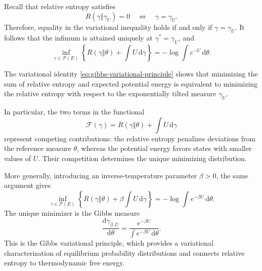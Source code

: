 \documentclass[12pt,a4paper,oneside]{book}
\begin{document}
\begin{solution}
Recall that relative entropy satisfies
\begin{equation*}
    R(\gamma\Vert\gamma_U)=0
    \quad\Longleftrightarrow\quad
    \gamma=\gamma_U.
\end{equation*}
Therefore, equality in the variational inequality holds if and
only if $\gamma=\gamma_U$. It follows that the infimum is attained
uniquely at $\gamma^*=\gamma_U$, and
\begin{equation}
    \boxed{
    \inf_{\gamma\in\mathcal P(E)}
    \left\{
        R(\gamma\Vert\theta)
        +\int U\,\mathrm d\gamma
    \right\}
    =
    -\log\int e^{-U}\,\mathrm d\theta.
    }
    \label{eq:gibbs-variational-principle}
\end{equation}

\end{solution}

\begin{Notice}
The variational identity \eqref{eq:gibbs-variational-principle} shows that minimizing the sum of relative
entropy and expected potential energy is equivalent to minimizing
the relative entropy with respect to the exponentially tilted
measure $\gamma_U$.

In particular, the two terms in the functional
\begin{equation*}
    \mathcal F(\gamma)
    =
    R(\gamma\Vert\theta)+\int U\,\mathrm d\gamma
\end{equation*}
represent competing contributions: the relative entropy penalizes
deviations from the reference measure $\theta$, whereas the
potential energy favors states with smaller values of $U$.
Their competition determines the unique minimizing distribution.

More generally, introducing an inverse-temperature parameter
$\beta>0$, the same argument gives
\begin{equation*}
    \inf_{\gamma\in\mathcal P(E)}
    \left\{
        R(\gamma\Vert\theta)
        +\beta\int U\,\mathrm d\gamma
    \right\}
    =
    -\log\int e^{-\beta U}\,\mathrm d\theta.
\end{equation*}
The unique minimizer is the Gibbs measure
\begin{equation*}
    \frac{\mathrm d\gamma_{\beta,U}}{\mathrm d\theta}
    =
    \frac{e^{-\beta U}}
    {\displaystyle\int e^{-\beta U}\,\mathrm d\theta}.
\end{equation*}
This is the Gibbs variational principle, which provides a
variational characterization of equilibrium probability
distributions and connects relative entropy to thermodynamic
free energy.
\end{Notice}
\end{document}
